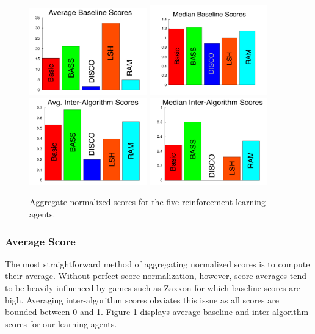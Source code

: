 \documentclass[twoside,11pt]{article}
\newcommand{\gamename}[1]{{\sc #1}}
\begin{document}
\begin{figure}
\begin{center}
\includegraphics[width=2in]{graphs/average_baselines.pdf}
\includegraphics[width=2in]{graphs/median_baselines.pdf}
\includegraphics[width=2in]{graphs/average_algos.pdf}
\includegraphics[width=2in]{graphs/median_interalgo.pdf}
\caption{
Aggregate normalized scores for the five reinforcement learning agents.
\label{fig:evaluation:aggregate_scores}}
\end{center}
\end{figure}

\subsubsection{Average Score}

The most straightforward method of aggregating normalized scores is to compute their average. Without perfect score normalization, however, score averages tend to be heavily influenced by games such as \gamename{Zaxxon} for which baseline scores are high. Averaging inter-algorithm scores obviates this issue as all 
scores are bounded between 0 and 1. Figure \ref{fig:evaluation:aggregate_scores} displays average 
baseline and inter-algorithm scores for our learning agents.
\end{document}
